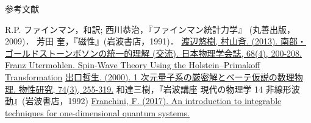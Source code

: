 \documentclass[../main.tex]{subfiles}
\begin{document}
\begin{frame}{参考文献}
    \beamertemplatetextbibitems
    \begin{thebibliography}{99}
         R.P. ファインマン，和訳; 西川恭治，『ファインマン統計力学』 (丸善出版，2009)．
         芳田 奎，『磁性』(岩波書店，1991)．
         \href{https://www.jstage.jst.go.jp/article/butsuri/68/4/68_KJ00008636350/_article/-char/ja/}{渡辺悠樹, 村山斉. (2013). 南部・ゴールドストーンボソンの統一的理解 (交流). 日本物理学会誌, 68(4), 200-208.}
         \href{https://cpb-us-w2.wpmucdn.com/u.osu.edu/dist/3/67057/files/2020/02/spin-wave_theory_using_the_Holstein-Primakoff_transformation.pdf}{Franz Utermohlen. Spin-Wave Theory Using the Holstein–Primakoff
        Transformation}
         \href{https://core.ac.uk/download/pdf/39228381.pdf}{出口哲生. (2000). 1 次元量子系の厳密解とベーテ仮説の数理物理. 物性研究, 74(3), 255-319.}
         和達三樹，『岩波講座 現代の物理学 14 非線形波動』(岩波書店，1992)
         \href{https://link.springer.com/content/pdf/10.1007/978-3-319-48487-7.pdf}{Franchini, F. (2017). An introduction to integrable techniques for one-dimensional quantum systems.}
    \end{thebibliography}
\end{frame}
\end{document}
